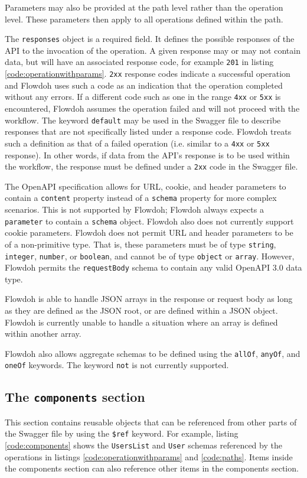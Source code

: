 Parameters may also be provided at the path level rather than the operation level. These parameters then apply to all operations defined within the path.

The \texttt{responses} object is a required field. It defines the possible responses of the API to the invocation of the operation. A given response may or may not contain data, but will have an associated response code, for example \texttt{201} in listing \ref{code:operationwithparams}. \texttt{2xx} response codes indicate a successful operation and Flowdoh uses such a code as an indication that the operation completed without any errors. If a different code such as one in the range \texttt{4xx} or \texttt{5xx} is encountered, Flowdoh assumes the operation failed and will not proceed with the workflow. The keyword \texttt{default} may be used in the Swagger file to describe responses that are not specifically listed under a response code. Flowdoh treats such a definition as that of a failed operation (i.e. similar to a \texttt{4xx} or \texttt{5xx} response). In other words, if data from the API's response is to be used within the workflow, the response must be defined under a \texttt{2xx} code in the Swagger file.

The OpenAPI specification allows for URL, cookie, and header parameters to contain a \texttt{content} property instead of a \texttt{schema} property for more complex scenarios. This is not supported by Flowdoh; Flowdoh always expects a \texttt{parameter} to contain a \texttt{schema} object. Flowdoh also does not currently support cookie parameters. Flowdoh does not permit URL and header parameters to be of a non-primitive type. That is, these parameters must be of type \texttt{string}, \texttt{integer}, \texttt{number}, or \texttt{boolean}, and cannot be of type \texttt{object} or \texttt{array}. However, Flowdoh permits the \texttt{requestBody} schema to contain any valid OpenAPI 3.0 data type.

Flowdoh is able to handle JSON arrays in the response or request body as long as they are defined as the JSON root, or are defined within a JSON object. Flowdoh is currently unable to handle a situation where an array is defined within another array.

Flowdoh also allows aggregate schemas to be defined using the \texttt{allOf}, \texttt{anyOf}, and \texttt{oneOf} keywords. The keyword \texttt{not} is not currently supported.

\subsection{The \texttt{components} section}
This section contains reusable objects that can be referenced from other parts of the Swagger file by using the \texttt{\$ref} keyword. For example, listing \ref{code:components} shows the \texttt{UsersList} and \texttt{User} schemas referenced by the operations in listings \ref{code:operationwithparams} and \ref{code:paths}. Items inside the components section can also reference other items in the components section.

